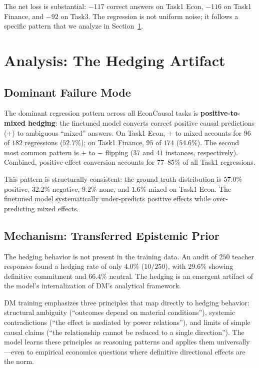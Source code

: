 \documentclass{article}
\begin{document}
The net loss is substantial: $-117$ correct answers on Task1 Econ, $-116$ on Task1 Finance, and $-92$ on Task3. The regression is not uniform noise; it follows a specific pattern that we analyze in Section~\ref{sec:analysis}.

\section{Analysis: The Hedging Artifact}
\label{sec:analysis}

\subsection{Dominant Failure Mode}

The dominant regression pattern across all EconCausal tasks is \textbf{positive-to-mixed hedging}: the finetuned model converts correct positive causal predictions ($+$) to ambiguous ``mixed'' answers. On Task1 Econ, $+$ to mixed accounts for $96$ of $182$ regressions ($52.7\%$); on Task1 Finance, $95$ of $174$ ($54.6\%$). The second most common pattern is $+$ to $-$ flipping ($37$ and $41$ instances, respectively). Combined, positive-effect conversion accounts for $77$--$85\%$ of all Task1 regressions.

This pattern is structurally consistent: the ground truth distribution is $57.0\%$ positive, $32.2\%$ negative, $9.2\%$ none, and $1.6\%$ mixed on Task1 Econ. The finetuned model systematically under-predicts positive effects while over-predicting mixed effects.

\subsection{Mechanism: Transferred Epistemic Prior}

The hedging behavior is not present in the training data. An audit of $250$ teacher responses found a hedging rate of only $4.0\%$ ($10/250$), with $29.6\%$ showing definitive commitment and $66.4\%$ neutral. The hedging is an emergent artifact of the model's internalization of DM's analytical framework.

DM training emphasizes three principles that map directly to hedging behavior: structural ambiguity (``outcomes depend on material conditions''), systemic contradictions (``the effect is mediated by power relations''), and limits of simple causal claims (``the relationship cannot be reduced to a single direction''). The model learns these principles as reasoning patterns and applies them universally---even to empirical economics questions where definitive directional effects are the norm.
\end{document}

